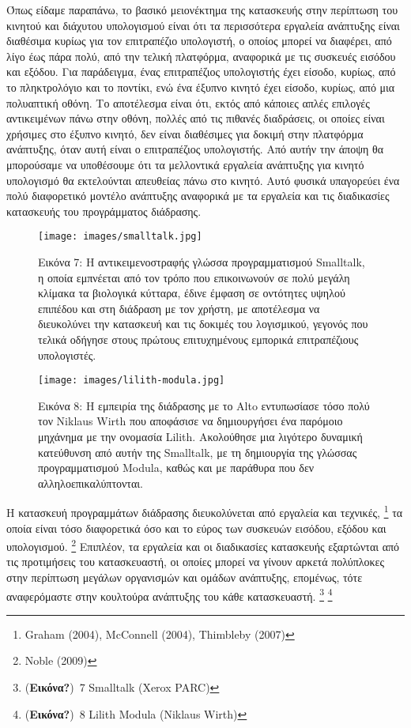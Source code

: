 \documentclass[
]{article}
\begin{document}
Όπως είδαμε παραπάνω, το βασικό μειονέκτημα της κατασκευής στην
περίπτωση του κινητού και διάχυτου υπολογισμού είναι ότι τα περισσότερα
εργαλεία ανάπτυξης είναι διαθέσιμα κυρίως για τον επιτραπέζιο
υπολογιστή, ο οποίος μπορεί να διαφέρει, από λίγο έως πάρα πολύ, από την
τελική πλατφόρμα, αναφορικά με τις συσκευές εισόδου και εξόδου. Για
παράδειγμα, ένας επιτραπέζιος υπολογιστής έχει είσοδο, κυρίως, από το
πληκτρολόγιο και το ποντίκι, ενώ ένα έξυπνο κινητό έχει είσοδο, κυρίως,
από μια πολυαπτική οθόνη. Το αποτέλεσμα είναι ότι, εκτός από κάποιες
απλές επιλογές αντικειμένων πάνω στην οθόνη, πολλές από τις πιθανές
διαδράσεις, οι οποίες είναι χρήσιμες στο έξυπνο κινητό, δεν είναι
διαθέσιμες για δοκιμή στην πλατφόρμα ανάπτυξης, όταν αυτή είναι ο
επιτραπέζιος υπολογιστής. Από αυτήν την άποψη θα μπορούσαμε να
υποθέσουμε ότι τα μελλοντικά εργαλεία ανάπτυξης για κινητό υπολογισμό θα
εκτελούνται απευθείας πάνω στο κινητό. Αυτό φυσικά υπαγορεύει ένα πολύ
διαφορετικό μοντέλο ανάπτυξης αναφορικά με τα εργαλεία και τις
διαδικασίες κατασκευής του προγράμματος διάδρασης.

\leavevmode{}%
\begin{figure}
\hypertarget{fig:smalltalk}{%
\centering
\texttt{[image: images/smalltalk.jpg]}
\caption{Εικόνα 7: Η αντικειμενοστραφής γλώσσα προγραμματισμού
Smalltalk, η οποία εμπνέεται από τον τρόπο που επικοινωνούν σε πολύ
μεγάλη κλίμακα τα βιολογικά κύτταρα, έδινε έμφαση σε οντότητες υψηλού
επιπέδου και στη διάδραση με τον χρήστη, με αποτέλεσμα να διευκολύνει
την κατασκευή και τις δοκιμές του λογισμικού, γεγονός που τελικά οδήγησε
στους πρώτους επιτυχημένους εμπορικά επιτραπέζιους
υπολογιστές.}\label{fig:smalltalk}
}
\end{figure}

\leavevmode{}%
\begin{figure}
\hypertarget{fig:lilith-modula}{%
\centering
\texttt{[image: images/lilith-modula.jpg]}
\caption{Εικόνα 8: Η εμπειρία της διάδρασης με το Alto εντυπωσίασε τόσο
πολύ τον Niklaus Wirth που αποφάσισε να δημιουργήσει ένα παρόμοιο
μηχάνημα με την ονομασία Lilith. Ακολούθησε μια λιγότερο δυναμική
κατεύθυνση από αυτήν της Smalltalk, με τη δημιουργία της γλώσσας
προγραμματισμού Modula, καθώς και με παράθυρα που δεν
αλληλοεπικαλύπτονται.}\label{fig:lilith-modula}
}
\end{figure}

Η κατασκευή προγραμμάτων διάδρασης διευκολύνεται από εργαλεία και
τεχνικές, \footnote{Graham (2004), McConnell (2004), Thimbleby (2007)}
τα οποία είναι τόσο διαφορετικά όσο και το εύρος των συσκευών εισόδου,
εξόδου και υπολογισμού. \footnote{Noble (2009)} Επιπλέον, τα εργαλεία
και οι διαδικασίες κατασκευής εξαρτώνται από τις προτιμήσεις του
κατασκευαστή, οι οποίες μπορεί να γίνουν αρκετά πολύπλοκες στην
περίπτωση μεγάλων οργανισμών και ομάδων ανάπτυξης, επομένως, τότε
αναφερόμαστε στην κουλτούρα ανάπτυξης του κάθε κατασκευαστή. \footnote{(\textbf{Εικόνα?})~7
  Smalltalk (Xerox PARC)} \footnote{(\textbf{Εικόνα?})~8 Lilith Modula
  (Niklaus Wirth)}
\end{document}
